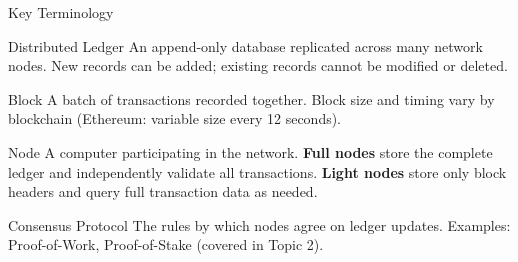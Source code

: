 \documentclass[10pt]{beamer}
\begin{document}
\begin{frame}{Key Terminology}
  \begin{block}{Distributed Ledger}
    An append-only database replicated across many network nodes. New records can be added; existing records cannot be modified or deleted.
  \end{block}
  
  \vspace{0.5em}
  \begin{block}{Block}
    A batch of transactions recorded together. Block size and timing vary by blockchain (Ethereum: variable size every 12 seconds).
  \end{block}
  
  \vspace{0.5em}
  \begin{block}{Node}
    A computer participating in the network. \textbf{Full nodes} store the complete ledger and independently validate all transactions. \textbf{Light nodes} store only block headers and query full transaction data as needed.
  \end{block}
  
  \vspace{0.5em}
  \begin{block}{Consensus Protocol}
    The rules by which nodes agree on ledger updates. Examples: Proof-of-Work, Proof-of-Stake (covered in Topic 2).
  \end{block}
\end{frame}
\end{document}
